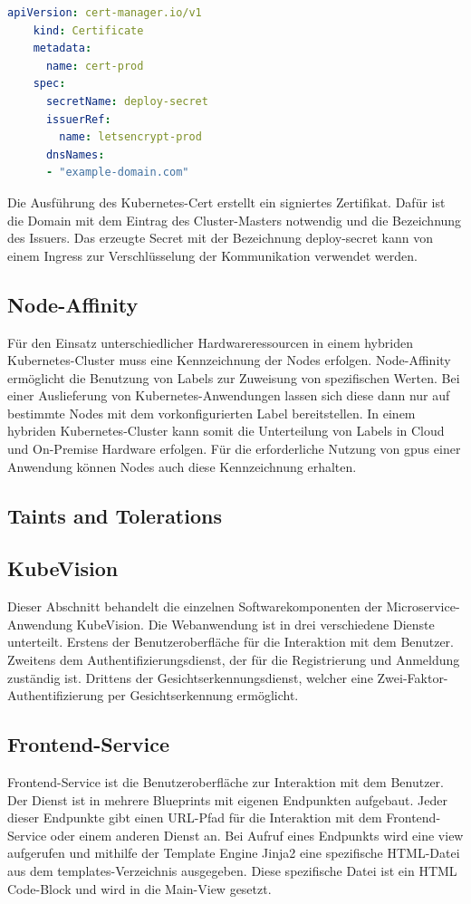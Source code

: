 \begin{lstlisting}[caption={cert.yaml \cite{certmanageracme} },captionpos=b,label={lst:cert},language=yaml]
    apiVersion: cert-manager.io/v1
    kind: Certificate
    metadata:
      name: cert-prod
    spec:
      secretName: deploy-secret
      issuerRef: 
        name: letsencrypt-prod
      dnsNames:
      - "example-domain.com"

\end{lstlisting}

Die Ausführung des Kubernetes-Cert erstellt ein signiertes Zertifikat.
Dafür ist die Domain mit dem Eintrag des Cluster-Masters notwendig und die Bezeichnung des Issuers.
Das erzeugte Secret mit der Bezeichnung deploy-secret kann von einem Ingress zur Verschlüsselung der Kommunikation verwendet werden.

\subsection{Node-Affinity}
Für den Einsatz unterschiedlicher Hardwareressourcen in einem hybriden Kubernetes-Cluster muss eine Kennzeichnung der Nodes erfolgen.
Node-Affinity ermöglicht die Benutzung von Labels zur Zuweisung von spezifischen Werten.
Bei einer Auslieferung von Kubernetes-Anwendungen lassen sich diese dann nur auf bestimmte Nodes mit dem vorkonfigurierten Label bereitstellen.
In einem hybriden Kubernetes-Cluster kann somit die Unterteilung von Labels in Cloud und On-Premise Hardware erfolgen.
Für die erforderliche Nutzung von \acs{gpu}s einer Anwendung können Nodes auch diese Kennzeichnung erhalten.


\subsection{Taints and Tolerations}


\subsection{KubeVision}
Dieser Abschnitt behandelt die einzelnen Softwarekomponenten der Microservice-Anwendung KubeVision.
Die Webanwendung ist in drei verschiedene Dienste unterteilt.
Erstens der Benutzeroberfläche für die Interaktion mit dem Benutzer.
Zweitens dem Authentifizierungsdienst, der für die Registrierung und Anmeldung zuständig ist.
Drittens der Gesichtserkennungsdienst, welcher eine Zwei-Faktor-Authentifizierung per Gesichtserkennung ermöglicht.

\subsection{Frontend-Service}
Frontend-Service ist die Benutzeroberfläche zur Interaktion mit dem Benutzer.
Der Dienst ist in mehrere Blueprints mit eigenen Endpunkten aufgebaut.
Jeder dieser Endpunkte gibt einen URL-Pfad für die Interaktion mit dem Frontend-Service oder einem anderen Dienst an.
Bei Aufruf eines Endpunkts wird eine view aufgerufen und mithilfe der Template Engine Jinja2 eine spezifische HTML-Datei aus dem templates-Verzeichnis ausgegeben.
Diese spezifische Datei ist ein HTML Code-Block und wird in die Main-View gesetzt.

